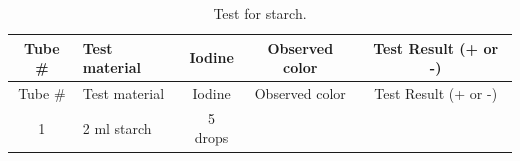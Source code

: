 \documentclass[]{book}
\theoremstyle{definition}
\theoremstyle{definition}
\theoremstyle{definition}
\theoremstyle{remark}
\begin{document}
\begin{longtable}[]{@{}clccc@{}}
\caption{\label{tab:starch} Test for starch.}\tabularnewline
\toprule
\begin{minipage}[b]{0.08\columnwidth}\centering\strut
Tube \#\strut
\end{minipage} & \begin{minipage}[b]{0.22\columnwidth}\raggedright\strut
Test material\strut
\end{minipage} & \begin{minipage}[b]{0.17\columnwidth}\centering\strut
Iodine\strut
\end{minipage} & \begin{minipage}[b]{0.18\columnwidth}\centering\strut
Observed color\strut
\end{minipage} & \begin{minipage}[b]{0.22\columnwidth}\centering\strut
Test Result (+ or -)\strut
\end{minipage}\tabularnewline
\midrule
\endfirsthead
\toprule
\begin{minipage}[b]{0.08\columnwidth}\centering\strut
Tube \#\strut
\end{minipage} & \begin{minipage}[b]{0.22\columnwidth}\raggedright\strut
Test material\strut
\end{minipage} & \begin{minipage}[b]{0.17\columnwidth}\centering\strut
Iodine\strut
\end{minipage} & \begin{minipage}[b]{0.18\columnwidth}\centering\strut
Observed color\strut
\end{minipage} & \begin{minipage}[b]{0.22\columnwidth}\centering\strut
Test Result (+ or -)\strut
\end{minipage}\tabularnewline
\midrule
\endhead
\begin{minipage}[t]{0.08\columnwidth}\centering\strut
1\strut
\end{minipage} & \begin{minipage}[t]{0.22\columnwidth}\raggedright\strut
2 ml starch\strut
\end{minipage} & \begin{minipage}[t]{0.17\columnwidth}\centering\strut
5 drops\strut
\end{minipage} & \begin{minipage}[t]{0.18\columnwidth}\centering\strut
\strut
\end{minipage} & \begin{minipage}[t]{0.22\columnwidth}\centering\strut

\end{minipage}
\end{longtable}
\end{document}
